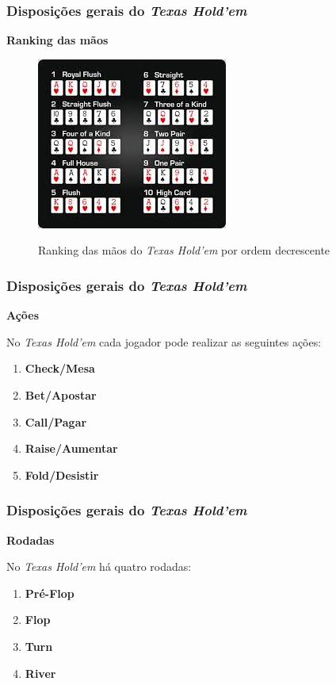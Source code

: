 \documentclass{beamer}
\begin{document}
\begin{frame}
\frametitle{Disposições gerais do \textit{Texas Hold'em}} 
\begin{center}
{\Large \textbf{Ranking das mãos}}
\end{center}
\begin{figure}[t]
	\centering
	\includegraphics[scale=.7]{ranking2}
	\label{rakingmaos}
	\caption{Ranking das mãos do \textit{Texas Hold'em} por ordem decrescente}
\end{figure}

\end{frame}

\begin{frame}	
\frametitle{Disposições gerais do \textit{Texas Hold'em}} 
\begin{center}
{\Large \textbf{Ações}}
\end{center}
No \textit{Texas Hold'em} cada jogador pode realizar as seguintes ações: 
\begin{enumerate}
\item \textbf{Check/Mesa}
\item \textbf{Bet/Apostar}
\item \textbf{Call/Pagar} 
\item \textbf{Raise/Aumentar}
\item \textbf{Fold/Desistir}
\end{enumerate}	
	
\end{frame}

\begin{frame}	
\frametitle{Disposições gerais do \textit{Texas Hold'em}} 
\begin{center}
{\Large \textbf{Rodadas}}
\end{center}
No \textit{Texas Hold'em} há quatro rodadas: 
\begin{enumerate}
\item \textbf{Pré-Flop}
\item \textbf{Flop}
\item \textbf{Turn}
\item \textbf{River}
\end{enumerate}	

\end{frame}
\end{document}
